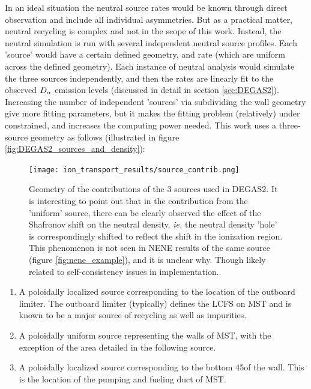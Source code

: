 In an ideal situation the neutral source rates would be known through direct observation and include all individual asymmetries. But as a practical matter, neutral recycling is complex and not in the scope of this work. Instead, the neutral simulation is run with several independent neutral source profiles. Each 'source' would have a certain defined geometry, and rate (which are uniform across the defined geometry). Each instance of neutral analysis would simulate the three sources independently, and then the rates are linearly fit to the observed $D_{\alpha}$ emission levels (discussed in detail in section \ref{sec:DEGAS2}). Increasing the number of independent 'sources' via subdividing the wall geometry give more fitting parameters, but it makes the fitting problem (relatively) under constrained, and increases the computing power needed. This work uses a three-source geometry as follows (illustrated in figure \ref{fig:DEGAS2_sources_and_density}):
\begin{figure}
	\centering
	\texttt{[image: ion\_transport\_results/source\_contrib.png]}
	\caption{Geometry of the contributions of the 3 sources used in DEGAS2. It is interesting to point out that in the contribution from the 'uniform' source, there can be clearly observed the effect of the Shafronov shift on the neutral density. \textit{ie.} the neutral density 'hole' is correspondingly shifted to reflect the shift in the ionization region. This phenomenon is not seen in NENE results of the same source (figure \ref{fig:nene_example}), and it is unclear why. Though likely related to self-consistency issues in implementation.}\label{fig:DEGAS2_sources_contrib}
\end{figure}
\begin{enumerate}
    \item A poloidally localized source corresponding to the location of the outboard limiter. The outboard limiter (typically) defines the LCFS on MST and is known to be a major source of recycling as well as impurities.  
    \item A poloidally uniform source representing the walls of MST, with the exception of the area detailed in the following source. 
    \item A poloidally localized source corresponding to the bottom 45\textdegree of the wall. This is the location of the pumping and fueling duct of MST. 
\end{enumerate}
